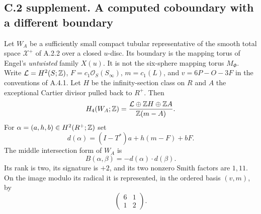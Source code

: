 \subsection{C.2 supplement. A computed coboundary with a different boundary}

\begin{proposition}
Let $W_A$ be a sufficiently small compact tubular representative of the
smooth total space $\mathcal X^+$ of A.2.2 over a closed $u$-disc.
Its boundary is the mapping torus of Engel's \emph{untwisted} family
$X(u)$. It is not the six-sphere mapping torus $M_\Phi$.
Write $\mathcal L=H^2(S;\mathbb Z)$, $F=c_1\mathcal O_S(S_\infty)$,
$m=c_1(L)$, and $v=6P-O-3F$ in the conventions of A.4.1.
Let $H$ be the infinity-section class on $R$ and $A$ the exceptional
Cartier divisor pulled back to $R^+$. Then
\[
 H_4(W_A;\mathbb Z)=
 \frac{\mathcal L\oplus\mathbb Z H\oplus\mathbb Z A}{\mathbb Z(m-A)}.
\]
For $\alpha=(a,h,b)\in H^2(R^+;\mathbb Z)$ set
\[
 d(\alpha)=(I-T^*)a+h(m-F)+bF.
\]
The middle intersection form of $W_A$ is
\[
 B(\alpha,\beta)=-d(\alpha)\cdot d(\beta).
\]
Its rank is two, its signature is $+2$, and its two nonzero Smith
factors are $1,11$. On the image modulo its radical it is represented,
in the ordered basis $(v,m)$, by
\[
 \begin{pmatrix}6&1\\1&2\end{pmatrix}.
\]
\end{proposition}
